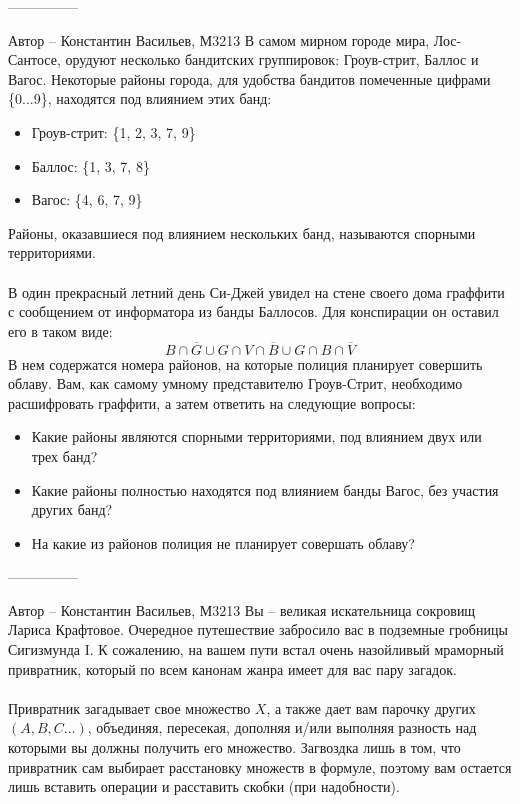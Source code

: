 \documentclass[10pt]{exam}
\begin{document}
\begin{questions}
---------------

Автор -- Константин Васильев, М3213\question
В самом мирном городе мира, Лос-Сантосе, орудуют несколько бандитских группировок: Гроув-стрит, Баллос и Вагос. Некоторые районы города, для удобства бандитов помеченные цифрами \{0...9\}, находятся под влиянием этих банд:
\begin{itemize}
    \item Гроув-стрит: \{1, 2, 3, 7, 9\}
    \item Баллос: \{1, 3, 7, 8\}
    \item Вагос: \{4, 6, 7, 9\}
\end{itemize}
Районы, оказавшиеся под влиянием нескольких банд, называются спорными территориями.
\\
\\
В один прекрасный летний день Си-Джей увидел на стене своего дома граффити с сообщением от информатора из банды Баллосов. Для конспирации он оставил его в таком виде:
\begin{equation*}
B \cap \overline{G} \cup G \cap V \cap \overline{B} \cup G \cap B \cap \overline{V}
\end{equation*}
В нем содержатся номера районов, на которые полиция планирует совершить облаву. Вам, как самому умному представителю Гроув-Стрит, необходимо расшифровать граффити, а затем ответить на следующие вопросы:

\begin{itemize}
    \item Какие районы являются спорными территориями, под влиянием двух или трех банд?
    \item Какие районы полностью находятся под влиянием банды Вагос, без участия других банд?
    \item На какие из районов полиция не планирует совершать облаву?
\end{itemize}

---------------

Автор -- Константин Васильев, М3213\question
Вы -- великая искательница сокровищ Лариса Крафтовое. Очередное путешествие забросило вас в подземные гробницы Сигизмунда I. К сожалению, на вашем пути встал очень назойливый мраморный привратник, который по всем канонам жанра имеет для вас пару загадок.
\\
\\
Привратник загадывает свое множество $X$, а также дает вам парочку других $(A,B,C…)$, объединяя, пересекая, дополняя и/или выполняя разность над которыми вы должны получить его множество. Загвоздка лишь в том, что привратник сам выбирает расстановку множеств в формуле, поэтому вам остается лишь вставить операции и расставить скобки (при надобности).


\end{questions}
\end{document}
